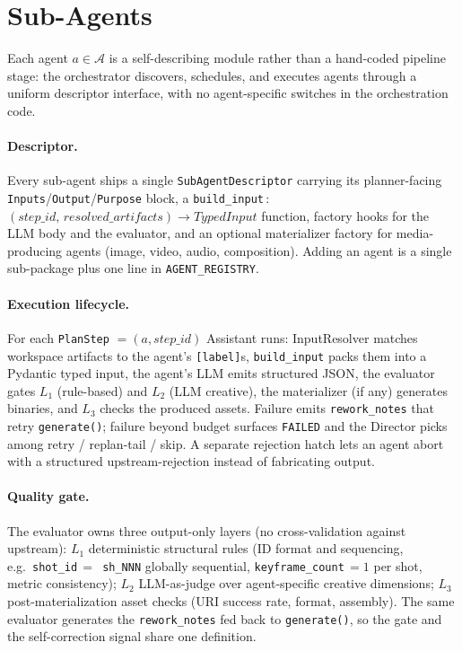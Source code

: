\section{Sub-Agents}
\label{sec:subagents}

Each agent $a\!\in\!\mathcal{A}$ is a self-describing module rather
than a hand-coded pipeline stage: the orchestrator discovers,
schedules, and executes agents through a uniform descriptor interface,
with no agent-specific switches in the orchestration code.

\paragraph{Descriptor.}
Every sub-agent ships a single \texttt{SubAgentDescriptor} carrying
its planner-facing \texttt{Inputs}/\texttt{Output}/\texttt{Purpose} block,
a \texttt{build\_input}\,$:$\,$(\textit{step\_id},\,\textit{resolved\_artifacts})\!\to\!\textit{TypedInput}$
function, factory hooks for the LLM body and the evaluator, and an
optional materializer factory for media-producing agents (image,
video, audio, composition). Adding an agent is a single sub-package
plus one line in \texttt{AGENT\_REGISTRY}.

\paragraph{Execution lifecycle.}
For each \texttt{PlanStep} $=(a,\textit{step\_id})$ Assistant runs:
InputResolver matches workspace artifacts to the agent's
\texttt{[label]}s, \texttt{build\_input} packs them into a Pydantic
typed input, the agent's LLM emits structured JSON, the evaluator gates
$L_1$ (rule-based) and $L_2$ (LLM creative), the materializer (if any)
generates binaries, and $L_3$ checks the produced assets. Failure
emits \texttt{rework\_notes} that retry \texttt{generate()}; failure
beyond budget surfaces \texttt{FAILED} and the Director picks among
retry / replan-tail / skip. A separate rejection hatch lets an agent
abort with a structured upstream-rejection instead of fabricating
output.

\paragraph{Quality gate.}
The evaluator owns three output-only layers (no cross-validation
against upstream): $L_1$ deterministic structural rules
(ID format and sequencing, e.g.\ \texttt{shot\_id}\,$\!=\!$\,
\texttt{sh\_NNN} globally sequential, \texttt{keyframe\_count}\,$\!=\!1$
per shot, metric consistency); $L_2$ LLM-as-judge over agent-specific
creative dimensions; $L_3$ post-materialization asset checks (URI
success rate, format, assembly). The same evaluator generates the
\texttt{rework\_notes} fed back to \texttt{generate()}, so the gate
and the self-correction signal share one definition.

